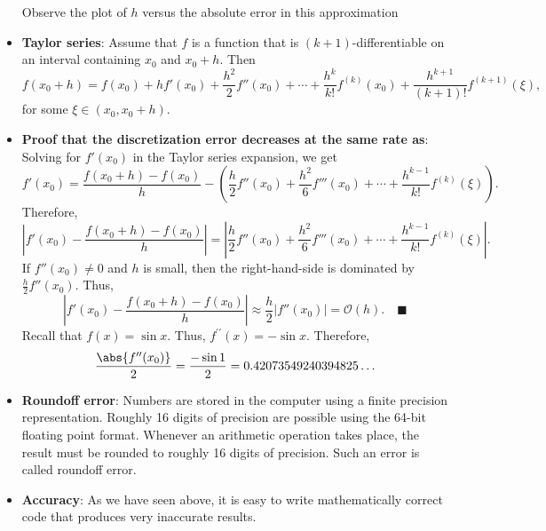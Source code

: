 \documentclass{report}
\begin{document}
\begin{itemize}
\begin{itemize}
            \end{itemize}
            \bigbreak \noindent 
            Observe the plot of $h$ versus the absolute error in this approximation
            \bigbreak \noindent 
        \item \textbf{Taylor series}: Assume that $f$ is a function that is $(k+1)$-differentiable on an interval containing $x_0$ and $x_0 + h$. Then
            $$
            f(x_0 + h) = f(x_0) + h f'(x_0) + \frac{h^2}{2} f''(x_0) + \cdots + \frac{h^k}{k!} f^{(k)}(x_0) + \frac{h^{k+1}}{(k+1)!} f^{(k+1)}(\xi),
            $$
            for some $\xi \in (x_0, x_0 + h)$.
        \item \textbf{Proof that the discretization error decreases at the same rate as}:
            Solving for $f'(x_0)$ in the Taylor series expansion, we get
            $$
            f'(x_0) = \frac{f(x_0+h)-f(x_0)}{h} - \left(\frac{h}{2} f''(x_0) + \frac{h^2}{6} f'''(x_0)  + \cdots + \frac{h^{k-1}}{k!} f^{(k)}(\xi)\right).
            $$
            Therefore,
            $$
            \left|f'(x_0) - \frac{f(x_0+h)-f(x_0)}{h}\right| = \left|\frac{h}{2} f''(x_0) + \frac{h^2}{6} f'''(x_0) + \cdots + \frac{h^{k-1}}{k!} f^{(k)}(\xi)\right|.
            $$
            If $f''(x_0) \neq 0$ and $h$ is small, then the right-hand-side is dominated by $\frac{h}{2} f''(x_0)$. Thus,
            $$
            \left|f'(x_0) - \frac{f(x_0+h)-f(x_0)}{h}\right| \approx \frac{h}{2}\left| f''(x_0)\right| = \mathcal{O}(h). \quad \blacksquare
            $$
            \bigbreak \noindent 
            Recall that $f(x) = \sin{x}$. Thus, $f^{\prime\prime}(x) = -\sin{x}$. Therefore,
            \begin{align*}
                \frac{\abs{f^{\prime\prime}(x_{0})}}{2} = \frac{-\sin{1}}{2} = 0.42073549240394825\ldots                
            \end{align*}
        \item \textbf{Roundoff error}: Numbers are stored in the computer using a finite precision representation. Roughly 16 digits of precision are possible using the 64-bit floating point format.
            \bigbreak \noindent 
            Whenever an arithmetic operation takes place, the result must be rounded to roughly 16 digits of precision. Such an error is called roundoff error.
        \item \textbf{Accuracy}: As we have seen above, it is easy to write mathematically correct code that produces very inaccurate results.
            \bigbreak \noindent 

\end{itemize}
\end{document}

